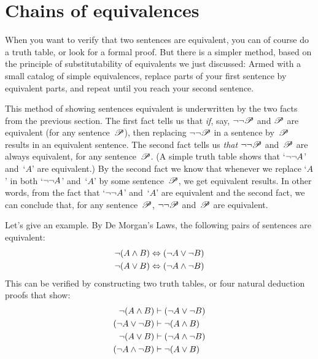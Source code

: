 \section{Chains of equivalences}

When you want to verify that two sentences are equivalent, you can of course do a truth table, or look for a formal proof.  But there is a simpler method, based on the principle of substitutability of equivalents we just discussed: Armed with a small catalog of simple equivalences, replace parts of your first sentence by equivalent parts, and repeat until you reach your second sentence.

This method of showing sentences equivalent is underwritten by the two facts from the previous section. The first fact tells us that \emph{if}, say, $\neg\neg \mathscr{P}$ and $\mathscr{P}$ are equivalent (for any sentence~$\mathscr{P}$), then replacing $\neg\neg\mathscr{P}$ in a sentence by~$\mathscr{P}$ results in an equivalent sentence. The second fact tells us \emph{that} $\neg\neg \mathscr{P}$ and~$\mathscr{P}$ are always equivalent, for any sentence~$\mathscr{P}$. (A simple truth table shows that `$\neg\neg A$' and~`$A$' are equivalent.) By the second fact we know that whenever we replace `$A$' in both `$\neg\neg A$' and~`$A$' by some sentence~$\mathscr{P}$, we get equivalent results. In other words, from the fact that `$\neg\neg A$' and~`$A$' are equivalent and the second fact, we can conclude that, for any sentence~$\mathscr{P}$, $\neg\neg \mathscr{P}$ and~$\mathscr{P}$ are equivalent.

Let's give an example. By De Morgan's Laws, the following pairs of sentences are equivalent:
\begin{align*}
	\neg (A \wedge B) & \Leftrightarrow (\neg A \vee \neg B)\\
	\neg (A \vee B) & \Leftrightarrow (\neg A \wedge \neg B)
\end{align*}
This can be verified by constructing two truth tables, or four natural deduction proofs that show:
\begin{align*}
	\neg (A \wedge B) & \vdash (\neg A \vee \neg B)\\
	(\neg A \vee \neg B) & \vdash \neg (A \wedge B)\\
	\neg (A \vee B) & \vdash (\neg A \wedge \neg B)\\
	(\neg A \wedge \neg B) & \vdash \neg (A \vee B)
\end{align*}

